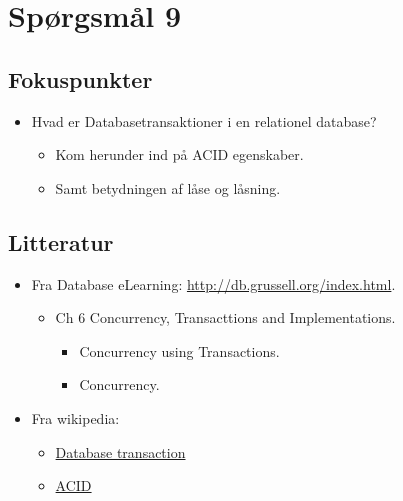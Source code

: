 \section{Spørgsmål 9}


\subsection{Fokuspunkter}
\begin{itemize}
	\item Hvad er Databasetransaktioner i en relationel database?
	\begin{itemize}
		\item Kom herunder ind på ACID egenskaber.
		\item Samt betydningen af låse og låsning.
	\end{itemize}
\end{itemize}

\subsection{Litteratur}
\begin{itemize}
	
	
	\item Fra Database eLearning: \url{http://db.grussell.org/index.html}.
	\begin{itemize}
		\item Ch 6 Concurrency, Transacttions and Implementations.
		\begin{itemize}
			\item Concurrency using Transactions.
			\item Concurrency.
		\end{itemize}
	\end{itemize}
	
	\item Fra wikipedia:
	\begin{itemize}
		\item \href{https://en.wikipedia.org/wiki/Database_transaction}{Database transaction}
		\item \href{https://en.wikipedia.org/wiki/ACID}{ACID}
	\end{itemize}
	
\end{itemize}


